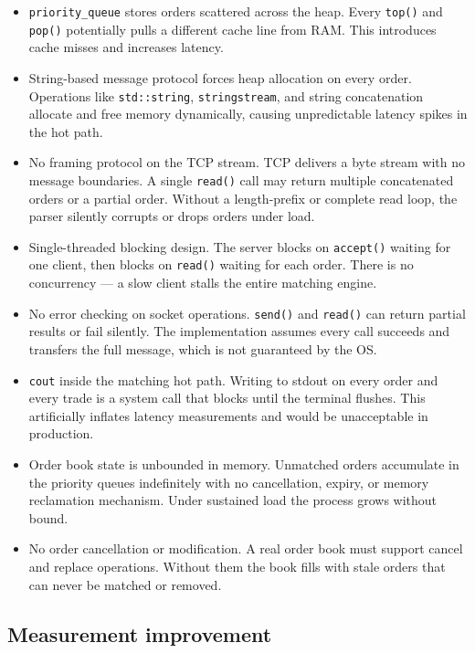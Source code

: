 \documentclass[11pt,a4paper]{article}
\begin{document}
\begin{itemize}
\item \texttt{priority\_queue} stores orders scattered across the heap.
      Every \texttt{top()} and \texttt{pop()} potentially pulls a different
      cache line from RAM. This introduces cache misses and increases
      latency.
\item String-based message protocol forces heap allocation on every order.
      Operations like \texttt{std::string}, \texttt{stringstream}, and
      string concatenation allocate and free memory dynamically, causing
      unpredictable latency spikes in the hot path.
\item No framing protocol on the TCP stream. TCP delivers a byte stream
      with no message boundaries. A single \texttt{read()} call may return
      multiple concatenated orders or a partial order. Without a
      length-prefix or complete read loop, the parser silently corrupts or
      drops orders under load.
\item Single-threaded blocking design. The server blocks on
      \texttt{accept()} waiting for one client, then blocks on
      \texttt{read()} waiting for each order. There is no concurrency ---
      a slow client stalls the entire matching engine.
\item No error checking on socket operations. \texttt{send()} and
      \texttt{read()} can return partial results or fail silently. The
      implementation assumes every call succeeds and transfers the full
      message, which is not guaranteed by the OS.
\item \texttt{cout} inside the matching hot path. Writing to stdout on
      every order and every trade is a system call that blocks until the
      terminal flushes. This artificially inflates latency measurements and
      would be unacceptable in production.
\item Order book state is unbounded in memory. Unmatched orders accumulate
      in the priority queues indefinitely with no cancellation, expiry, or
      memory reclamation mechanism. Under sustained load the process grows
      without bound.
\item No order cancellation or modification. A real order book must support
      cancel and replace operations. Without them the book fills with stale
      orders that can never be matched or removed.
\end{itemize}

\subsection{Measurement improvement}
\end{document}
